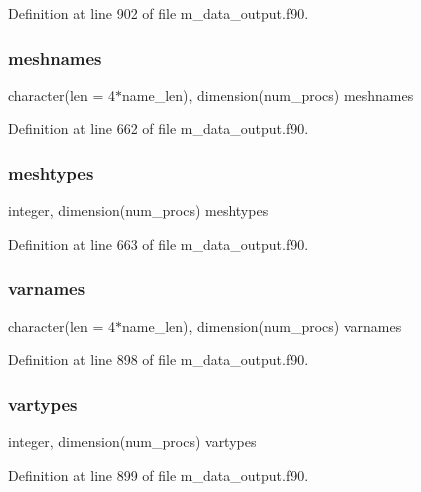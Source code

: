 Definition at line 902 of file m\+\_\+data\+\_\+output.\+f90.

\mbox{\label{m__data__output_8f90_a6072065026442573b37ac7e4bbd0bc25}} 
\subsubsection{\texorpdfstring{meshnames}{meshnames}}
{\footnotesize\ttfamily character(len = 4$\ast$name\+\_\+len), dimension(num\+\_\+procs) meshnames}



Definition at line 662 of file m\+\_\+data\+\_\+output.\+f90.

\mbox{\label{m__data__output_8f90_ab445dfab128e2e9f8b7e51f51f54c095}} 
\subsubsection{\texorpdfstring{meshtypes}{meshtypes}}
{\footnotesize\ttfamily integer, dimension(num\+\_\+procs) meshtypes}



Definition at line 663 of file m\+\_\+data\+\_\+output.\+f90.

\mbox{\label{m__data__output_8f90_abef5dbfec3461a8726fd983ab5e7afb8}} 
\subsubsection{\texorpdfstring{varnames}{varnames}}
{\footnotesize\ttfamily character(len = 4$\ast$name\+\_\+len), dimension(num\+\_\+procs) varnames}



Definition at line 898 of file m\+\_\+data\+\_\+output.\+f90.

\mbox{\label{m__data__output_8f90_a36cb070ec6a82e3a699ac20c28f1138e}} 
\subsubsection{\texorpdfstring{vartypes}{vartypes}}
{\footnotesize\ttfamily integer, dimension(num\+\_\+procs) vartypes}



Definition at line 899 of file m\+\_\+data\+\_\+output.\+f90.

